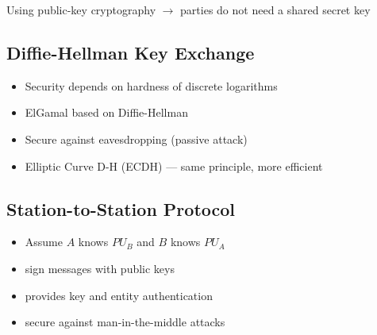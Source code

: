 \documentclass[draft]{article}
\begin{document}
Using public-key cryptography $\rightarrow$ parties do not need a shared secret key

\subsection{Diffie-Hellman Key Exchange}
\begin{itemize}[nosep]
    \item Security depends on hardness of discrete logarithms
    \item ElGamal based on Diffie-Hellman
    \item Secure against eavesdropping (passive attack)
    \item Elliptic Curve D-H (ECDH) --- same principle, more efficient
\end{itemize}
\subsection{Station-to-Station Protocol}
\begin{itemize}[nosep]
    \item Assume $A$ knows $PU_B$ and $B$ knows $PU_A$
    \item sign messages with public keys
    \item provides key and entity authentication
    \item secure against man-in-the-middle attacks
\end{itemize}
\end{document}
